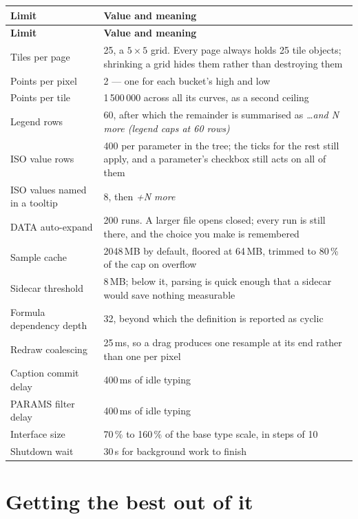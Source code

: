 \documentclass[11pt,a4paper,oneside]{report}
\begin{document}
\begin{center}
\small
\begin{longtable}{@{}p{}p{}@{}}
\toprule
\textbf{Limit} & \textbf{Value and meaning} \\
\midrule
\endfirsthead
\toprule
\textbf{Limit} & \textbf{Value and meaning} \\
\midrule
\endhead
Tiles per page & 25, a $5 \times 5$ grid. Every page always holds 25 tile objects; shrinking a grid hides them rather than destroying them \\
Points per pixel & 2 --- one for each bucket's high and low \\
Points per tile & 1\,500\,000 across all its curves, as a second ceiling \\
Legend rows & 60, after which the remainder is summarised as \emph{\ldots and N more (legend caps at 60 rows)} \\
ISO value rows & 400 per parameter in the tree; the ticks for the rest still apply, and a parameter's checkbox still acts on all of them \\
ISO values named in a tooltip & 8, then \emph{+N more} \\
DATA auto-expand & 200 runs. A larger file opens closed; every run is still there, and the choice you make is remembered \\
Sample cache & 2048\,MB by default, floored at 64\,MB, trimmed to 80\,\% of the cap on overflow \\
Sidecar threshold & 8\,MB; below it, parsing is quick enough that a sidecar would save nothing measurable \\
Formula dependency depth & 32, beyond which the definition is reported as cyclic \\
Redraw coalescing & 25\,ms, so a drag produces one resample at its end rather than one per pixel \\
Caption commit delay & 400\,ms of idle typing \\
PARAMS filter delay & 400\,ms of idle typing \\
Interface size & 70\,\% to 160\,\% of the base type scale, in steps of 10 \\
Shutdown wait & 30\,s for background work to finish \\
\bottomrule
\end{longtable}
\end{center}

\section{Getting the best out of it}
\end{document}
